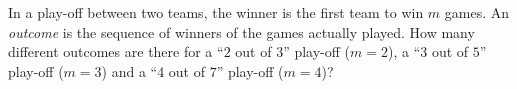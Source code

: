 In a play-off between two teams, the winner is the first team to win $m$ games. An \emph{outcome} is the sequence of winners of the games actually played. How many different outcomes are there for a ``$2$ out of $3$'' play-off ($m=2$), a ``$3$ out of $5$'' play-off ($m=3$) and a ``$4$ out of $7$'' play-off ($m=4$)?
